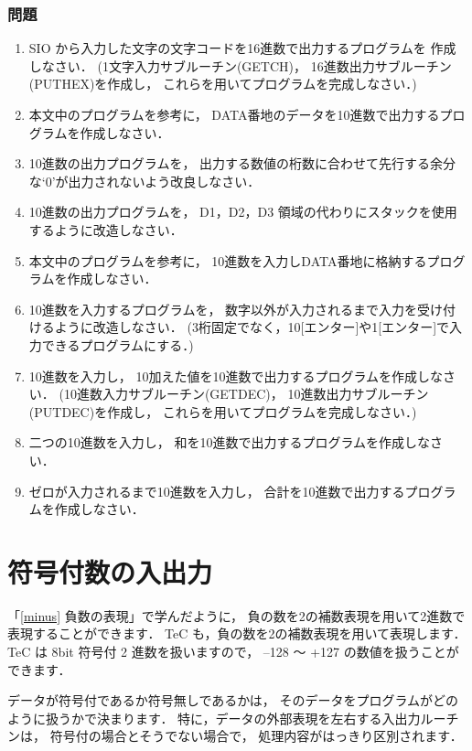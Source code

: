 \subsubsection{問題}
\begin{enumerate}
\item SIO から入力した文字の文字コードを16進数で出力するプログラムを
作成しなさい．
(1文字入力サブルーチン(GETCH)，
16進数出力サブルーチン(PUTHEX)を作成し，
これらを用いてプログラムを完成しなさい．)
\item 本文中のプログラムを参考に，
DATA番地のデータを10進数で出力するプログラムを作成しなさい．
\item 10進数の出力プログラムを，
出力する数値の桁数に合わせて先行する余分な`0'が出力されないよう改良しなさい．
\item 10進数の出力プログラムを，
D1，D2，D3 領域の代わりにスタックを使用するように改造しなさい．
\item 本文中のプログラムを参考に，
10進数を入力しDATA番地に格納するプログラムを作成しなさい．
\item 10進数を入力するプログラムを，
数字以外が入力されるまで入力を受け付けるように改造しなさい．
(3桁固定でなく，10[エンター]や1[エンター]で入力できるプログラムにする．)
\item 10進数を入力し，
10加えた値を10進数で出力するプログラムを作成しなさい．
(10進数入力サブルーチン(GETDEC)，
10進数出力サブルーチン(PUTDEC)を作成し，
これらを用いてプログラムを完成しなさい．)
\item 二つの10進数を入力し，
和を10進数で出力するプログラムを作成しなさい．
\item ゼロが入力されるまで10進数を入力し，
合計を10進数で出力するプログラムを作成しなさい．
\end{enumerate}

\newpage
\section{符号付数の入出力}

「\ref{minus} 負数の表現」で学んだように，
負の数を2の補数表現を用いて2進数で表現することができます．
TeC も，負の数を2の補数表現を用いて表現します．
TeC は 8bit 符号付 2 進数を扱いますので，
--128 〜 +127 の数値を扱うことができます．

データが符号付であるか符号無しであるかは，
そのデータをプログラムがどのように扱うかで決まります．
特に，データの外部表現を左右する入出力ルーチンは，
符号付の場合とそうでない場合で，
処理内容がはっきり区別されます．

